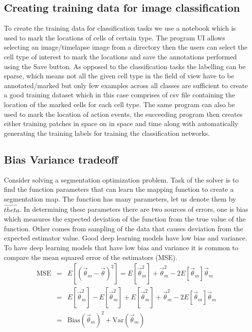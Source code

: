 \documentclass[a4paper,10pt]{article}
\begin{document}
\subsection{Creating training data for image classification\label{td_class}}
To create the training data for classification tasks we use a notebook which is used to mark the locations of cells of certain type. The program UI allows selecting an image/timelapse image from a directory then the users can select the cell type of interest to mark the locations and save the annotations performed using the Save button.
As opposed to the classification tasks the labelling can be sparse, which means not all the given cell type in the field of view have to be annotated/marked but only few examples across all classes are sufficient to create a good training dataset which in this case comprises of csv file containing the location of the marked cells for each cell type. The same program can also be used to mark the location of action events, the succeeding program then creates either training patches in space on in space and time along with automatically generating the training labels for training the classification networks.
\subsection{Bias Variance tradeoff \label{bias_variance}}
Consider solving a segmentation optimization problem. Task of the solver is to find the function parameters that can learn the mapping function to create a segmentation map. The function has many parameters, let us denote them by $\vec{theta}$. In determining these parameters there are two sources of errors, one is bias which measures the expected deviation of the function from the true value of the function. Other comes from sampling of the data that causes deviation from the expected estimator value. Good deep learning models have low bias and variance. To have deep learning models that have low bias and variance it is common to compare the mean squared error of the estimators (MSE). 
\begin{eqnarray}
\mathrm{MSE} & = & E[(\vec{\theta}_m - \vec{\theta})^2] = E[\vec{\theta}_m^2] + \vec{\theta}_m^2 - 2E[\vec{\theta}_m]\vec{\theta}_m \nonumber \\
& = & 	E[\vec{\theta}_m^2] - E[\vec{\theta}_m^2]  + E[\vec{\theta}_m^2] + \vec{\theta}_m^2  - 2E[\vec{\theta}_m]\vec{\theta}_m \nonumber \\
& = & \mathrm{Bias}(\vec{\theta}_m)^2 + \mathrm{Var}(\vec{\theta}_m) 
\end{eqnarray}	
\end{document}
